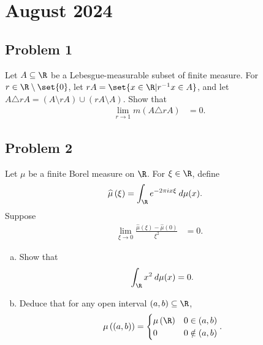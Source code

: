 \documentclass[10pt]{mypackage}
\begin{document}
\section{August 2024}%
\subsection{Problem 1}%
\begin{problem}
  Let $A\subseteq \R$ be a Lebesgue-measurable subset of finite measure. For $r\in\R\setminus \set{0}$, let $rA = \set{x\in \R | r^{-1}x\in A}$, and let $A\triangle rA = \left( A\setminus rA \right) \cup \left( rA\setminus A \right)$. Show that
  \begin{align*}
    \lim_{r\rightarrow 1} m\left( A\triangle rA \right) &= 0.
  \end{align*}
\end{problem}
\subsection{Problem 2}%
\begin{problem}
  Let $\mu$ be a finite Borel measure on $\R$. For $\xi\in\R$, define
  \begin{align*}
    \widehat{\mu}\left( \xi \right) &= \int_{\R}^{} e^{-2\pi i x\xi}\:d\mu(x).
  \end{align*}
  Suppose
  \begin{align*}
    \lim_{\xi\rightarrow 0} \frac{\widehat{\mu}\left( \xi \right) - \widehat{\mu}(0)}{\xi^2} &= 0.
  \end{align*}
  \begin{enumerate}[(a)]
    \item Show that
      \begin{align*}
        \int_{\R}^{} x^2\:d\mu(x) &= 0.
      \end{align*}
    \item Deduce that for any open interval $\left( a,b \right)\subseteq \R$,
      \begin{align*}
        \mu\left( \left( a,b \right) \right) &= \begin{cases}
          \mu\left( \R \right) & 0\in (a,b)\\
          0 & 0\notin (a,b)
        \end{cases}.
      \end{align*}
  \end{enumerate}
\end{problem}
\end{document}
